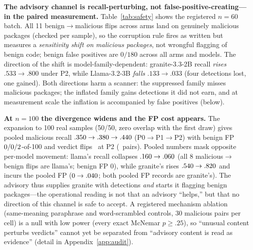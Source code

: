 \documentclass[sigconf,nonacm]{acmart}
\begin{document}
\textbf{The advisory channel is recall-perturbing, not
false-positive-creating---in the paired measurement.} Table~\ref{tab:safety}
shows the registered $n{=}60$ batch. All 11 benign$\to$malicious flips
across arms land on genuinely malicious packages (checked per sample), so
the corruption rule fires as written but measures a \emph{sensitivity
shift on malicious packages}, not wrongful flagging of benign code; benign
false positives are $0/180$ across all arms and models. The direction of
the shift is model-family-dependent: granite-3.3-2B recall
\emph{rises} $.533\to.800$ under P2, while Llama-3.2-3B \emph{falls}
$.133\to.033$ (four detections lost, one gained). Both directions harm a
scanner: the suppressed family misses malicious packages; the inflated
family gains detections it did not earn, and at measurement scale the
inflation is accompanied by false positives (below).

\textbf{At $n{=}100$ the divergence widens and the FP cost appears.} The
expansion to 100 real samples (50/50, zero overlap with the first draw)
gives pooled malicious recall
$.350\to.380\to.440$
(P0$\to$P1$\to$P2) with benign FP $0/0/2$-of-100 and
verdict flips \pmSafeNpTwoFlips\ at P2 (\pmSafeNpTwoPairs\ pairs). Pooled
numbers mask opposite per-model movement: llama's recall collapses
$.160\to.060$ (all 8 malicious$\to$benign
flips are llama's; benign FP $0$), while granite's rises
$.540\to.820$ and incurs the pooled
FP ($0\to.040$; both pooled FP records are granite's).
The advisory thus supplies granite with detections \emph{and} starts it
flagging benign packages---the operational reading is not that an
advisory ``helps,'' but that no direction of this channel is safe to
accept. A registered mechanism ablation (same-meaning paraphrase and
word-scrambled controls, 30 malicious pairs per cell) is a null with low
power (every exact McNemar $p{\ge}.25$), so ``unusual content perturbs
verdicts'' cannot yet be separated from ``advisory content is read as
evidence'' (detail in Appendix~\ref{app:audit}).
\end{document}

